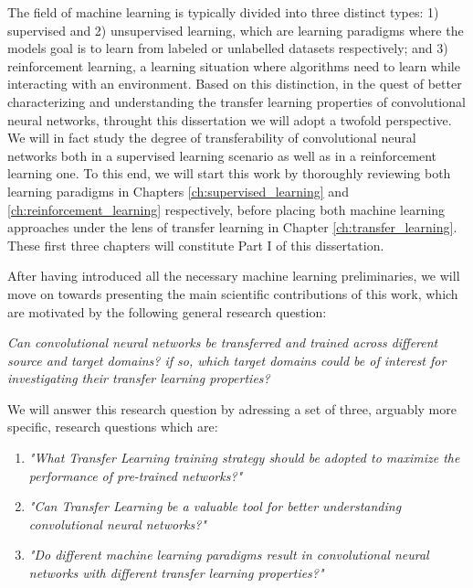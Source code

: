 The field of machine learning is typically divided into three distinct types: 1) supervised and 2) unsupervised learning, which are learning paradigms where the models goal is to learn from labeled or unlabelled datasets respectively; and 3) reinforcement learning, a learning situation where algorithms need to learn while interacting with an environment. Based on this distinction, in the quest of better characterizing and understanding the transfer learning properties of convolutional neural networks, throught this dissertation we will adopt a twofold perspective. We will in fact study the degree of transferability of convolutional neural networks both in a supervised learning scenario as well as in a reinforcement learning one. To this end, we will start this work by thoroughly reviewing both learning paradigms in Chapters \ref{ch:supervised_learning} and \ref{ch:reinforcement_learning} respectively, before placing both machine learning approaches under the lens of transfer learning in Chapter \ref{ch:transfer_learning}. These first three chapters will constitute Part I of this dissertation.

After having introduced all the necessary machine learning preliminaries, we will move on towards presenting the main scientific contributions of this work, which are motivated by the following general research question:
\begin{center}
	\textit{Can convolutional neural networks be transferred and trained across different source and target domains? if so, which target domains could be of interest for investigating their transfer learning properties?}	
\end{center}    

We will answer this research question by adressing a set of three, arguably more specific, research questions which are:
\begin{enumerate}
	\item \textit{"What Transfer Learning training strategy should be adopted to maximize the performance of pre-trained networks?"}

	\item \textit{"Can Transfer Learning be a valuable tool for better understanding convolutional neural networks?"}
	
	\item \textit{"Do different machine learning paradigms result in convolutional neural networks with different transfer learning properties?"}
\end{enumerate}

